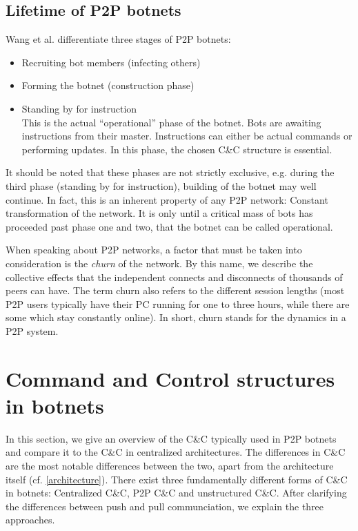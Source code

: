 \documentclass{llncs}
\begin{document}
\subsection{Lifetime of P2P botnets}
Wang et al.\cite{wang2009systematic} differentiate three stages of P2P botnets:
\begin{itemize}
\item Recruiting bot members (infecting others)
\item Forming the botnet (construction phase)
\item Standing by for instruction \\
This is the actual ``operational'' phase of the botnet. Bots are awaiting instructions from their master. Instructions can either be actual commands or performing updates. In this phase, the chosen C\&C structure is essential.
\end{itemize}
It should be noted that these phases are not strictly exclusive,
e.g. during the third phase (standing by for instruction), building of
the botnet may well continue. In fact, this is an inherent property of
any P2P network: Constant transformation of the network. It is only
until a critical mass of bots has proceeded past phase one and two,
that the botnet can be called operational.

When speaking about P2P networks, a factor that must be taken into
consideration is the {\it churn} of the network. By this name, we
describe the collective effects that the independent connects and
disconnects of thousands of peers can have. The term churn also refers
to the different session lengths (most P2P users typically have their
PC running for one to three hours, while there are some which stay
constantly online). In short, churn stands for the dynamics in a P2P
system. \cite{stutzbach2006understanding}

\section{Command and Control structures in botnets}
In this section, we give an overview of the C\&C typically used in P2P
botnets and compare it to the C\&C in centralized architectures. The
differences in C\&C are the most notable differences between the two,
apart from the architecture itself (cf. \ref{architecture}). There
exist three fundamentally different forms of C\&C in botnets:
Centralized C\&C, P2P C\&C and unstructured C\&C. After clarifying the
differences between push and pull communciation, we explain the three
approaches.
\end{document}
